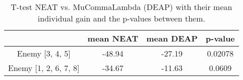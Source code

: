 
    \begin{table}[ht]
        \centering
        \begin{tabular}{c|c|c|c}
            & mean NEAT & mean DEAP & p-value \\
            \hline
    
                Enemy [3, 4, 5] & -48.94 & -27.19 & 0.02078 \\
        
                Enemy [1, 2, 6, 7, 8] & -34.67 & -11.63 & 0.0609 \\
        
        \end{tabular}
        \caption{T-test NEAT vs. MuCommaLambda (DEAP) with their mean individual gain and the p-values between them.}
        \label{tab:ttest_results}
    \end{table}
    